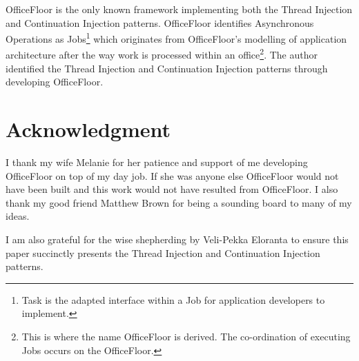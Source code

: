 \documentclass[prodmode]{style/acmlarge}
\begin{document}
OfficeFloor \cite{officefloor} is the only known framework implementing both the
Thread Injection and Continuation Injection patterns.  OfficeFloor identifies
Asynchronous Operations as Jobs\footnote{Task is the adapted interface within a
Job for application developers to implement.} which originates from
OfficeFloor's modelling of application architecture after the way work is
processed within an office\footnote{This is where the name OfficeFloor is
derived. The co-ordination of executing Jobs occurs on the OfficeFloor.}.
The author identified the Thread Injection and Continuation Injection patterns
through developing OfficeFloor.


\section*{Acknowledgment} I thank my wife Melanie for her patience and support
of me developing OfficeFloor on top of my day job.  If she was anyone else
OfficeFloor would not have been built and this work would not have resulted from
OfficeFloor.  I also thank my good friend Matthew Brown for being a sounding
board to many of my ideas.

I am also grateful for the wise shepherding by Veli-Pekka Eloranta to ensure
this paper succinctly presents the Thread Injection and Continuation Injection
patterns.




\end{document}
